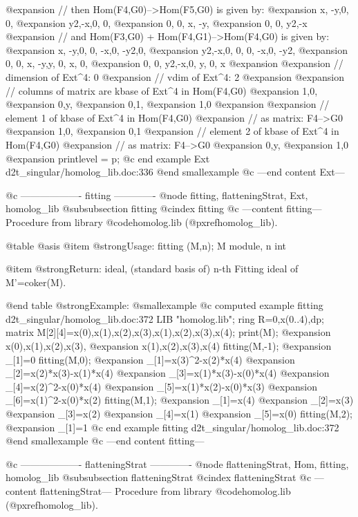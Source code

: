@expansion{} // then Hom(F4,G0)-->Hom(F5,G0) is given by:
@expansion{} x, -y,0, 0, 
@expansion{} y2,-x,0, 0, 
@expansion{} 0, 0, x, -y,
@expansion{} 0, 0, y2,-x 
@expansion{} // and Hom(F3,G0) + Hom(F4,G1)-->Hom(F4,G0) is given by:
@expansion{} x, -y,0, 0, -x,0, -y2,0,  
@expansion{} y2,-x,0, 0, 0, -x,0,  -y2,
@expansion{} 0, 0, x, -y,y, 0, x,  0,  
@expansion{} 0, 0, y2,-x,0, y, 0,  x   
@expansion{} 
@expansion{} // dimension of Ext^4:  0
@expansion{} // vdim of Ext^4:       2
@expansion{} 
@expansion{} // columns of matrix are kbase of Ext^4 in Hom(F4,G0)
@expansion{} 1,0,
@expansion{} 0,y,
@expansion{} 0,1,
@expansion{} 1,0 
@expansion{} 
@expansion{} // element 1 of kbase of Ext^4 in Hom(F4,G0)
@expansion{} // as matrix: F4-->G0
@expansion{} 1,0,
@expansion{} 0,1 
@expansion{} // element 2 of kbase of Ext^4 in Hom(F4,G0)
@expansion{} // as matrix: F4-->G0
@expansion{} 0,y,
@expansion{} 1,0 
@expansion{} 
printlevel = p;
@c end example Ext d2t_singular/homolog_lib.doc:336
@end smallexample
@c ---end content Ext---

@c ------------------- fitting -------------
@node fitting, flatteningStrat, Ext, homolog_lib
@subsubsection fitting
@cindex fitting
@c ---content fitting---
Procedure from library @code{homolog.lib} (@pxref{homolog_lib}).

@table @asis
@item @strong{Usage:}
fitting (M,n); M module, n int

@item @strong{Return:}
ideal, (standard basis of) n-th Fitting ideal of M'=coker(M).

@end table
@strong{Example:}
@smallexample
@c computed example fitting d2t_singular/homolog_lib.doc:372 
LIB "homolog.lib";
ring R=0,x(0..4),dp;
matrix M[2][4]=x(0),x(1),x(2),x(3),x(1),x(2),x(3),x(4);
print(M);
@expansion{} x(0),x(1),x(2),x(3),
@expansion{} x(1),x(2),x(3),x(4) 
fitting(M,-1);
@expansion{} _[1]=0
fitting(M,0);
@expansion{} _[1]=x(3)^2-x(2)*x(4)
@expansion{} _[2]=x(2)*x(3)-x(1)*x(4)
@expansion{} _[3]=x(1)*x(3)-x(0)*x(4)
@expansion{} _[4]=x(2)^2-x(0)*x(4)
@expansion{} _[5]=x(1)*x(2)-x(0)*x(3)
@expansion{} _[6]=x(1)^2-x(0)*x(2)
fitting(M,1);
@expansion{} _[1]=x(4)
@expansion{} _[2]=x(3)
@expansion{} _[3]=x(2)
@expansion{} _[4]=x(1)
@expansion{} _[5]=x(0)
fitting(M,2);
@expansion{} _[1]=1
@c end example fitting d2t_singular/homolog_lib.doc:372
@end smallexample
@c ---end content fitting---

@c ------------------- flatteningStrat -------------
@node flatteningStrat, Hom, fitting, homolog_lib
@subsubsection flatteningStrat
@cindex flatteningStrat
@c ---content flatteningStrat---
Procedure from library @code{homolog.lib} (@pxref{homolog_lib}).

